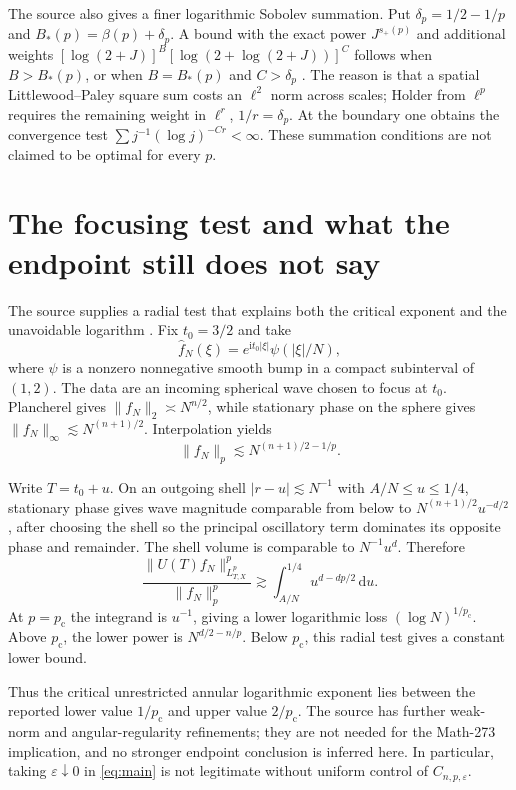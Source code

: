 \documentclass[11pt,a4paper]{article}
\numberwithin{equation}{section}
\theoremstyle{definition}
\theoremstyle{remark}
\newcommand{\eps}{\varepsilon}
\newcommand{\dd}{\,\mathrm d}
\newcommand{\pc}{p_{\mathrm c}}
\begin{document}
The source also gives a finer logarithmic Sobolev summation. Put
$\delta_p=1/2-1/p$ and $B_*(p)=\beta(p)+\delta_p$. A bound with the exact
power $J^{s_+(p)}$ and additional weights
$[\log(2+J)]^B[\log(2+\log(2+J))]^C$ follows when $B>B_*(p)$, or when
$B=B_*(p)$ and $C>\delta_p$ \cite{transfer}. The reason is that a spatial
Littlewood--Paley square sum costs an $\ell^2$ norm across scales; Holder from
$\ell^p$ requires the remaining weight in $\ell^r$, $1/r=\delta_p$.
At the boundary one obtains the convergence test
$\sum j^{-1}(\log j)^{-Cr}<\infty$. These summation conditions are not
claimed to be optimal for every $p$.

\section{The focusing test and what the endpoint still does not say}
\label{sec:sharpness}
The source supplies a radial test that explains both the critical exponent
and the unavoidable logarithm \cite{sharpness}. Fix $t_0=3/2$ and take
\[
 \widehat f_N(\xi)=e^{\mathrm it_0|\xi|}\psi(|\xi|/N),
\]
where $\psi$ is a nonzero nonnegative smooth bump in a compact subinterval of
$(1,2)$. The data are an incoming spherical wave chosen to focus at $t_0$.
Plancherel gives $\|f_N\|_2\asymp N^{n/2}$, while stationary phase on the
sphere gives $\|f_N\|_\infty\lesssim N^{(n+1)/2}$. Interpolation yields
\[
 \|f_N\|_p\lesssim N^{(n+1)/2-1/p}.
\]

Write $T=t_0+u$. On an outgoing shell $|r-u|\lesssim N^{-1}$ with
$A/N\le u\le1/4$, stationary phase gives wave magnitude comparable from
below to $N^{(n+1)/2}u^{-d/2}$, after choosing the shell so the principal
oscillatory term dominates its opposite phase and remainder. The shell volume
is comparable to $N^{-1}u^d$. Therefore
\begin{equation}\label{eq:focusintegral}
 \frac{\|U(T)f_N\|_{L^p_{T,X}}^p}{\|f_N\|_p^p}
 \gtrsim \int_{A/N}^{1/4}u^{d-dp/2}\dd u.
\end{equation}
At $p=\pc$ the integrand is $u^{-1}$, giving a lower logarithmic loss
$(\log N)^{1/\pc}$. Above $\pc$, the lower power is
$N^{d/2-n/p}$. Below $\pc$, this radial test gives a constant lower bound.

Thus the critical unrestricted annular logarithmic exponent lies between the
reported lower value $1/\pc$ and upper value $2/\pc$. The source has further
weak-norm and angular-regularity refinements; they are not needed for the
Math-273 implication, and no stronger endpoint conclusion is inferred here.
In particular, taking $\eps\downarrow0$ in \eqref{eq:main} is not legitimate
without uniform control of $C_{n,p,\eps}$.
\end{document}

